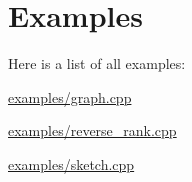 \section{Examples}
Here is a list of all examples\+:\begin{DoxyCompactItemize}
\item 
\hyperlink{examples_2graph_8cpp-example}{examples/graph.\+cpp}
\item 
\hyperlink{examples_2reverse_rank_8cpp-example}{examples/reverse\+\_\+rank.\+cpp}
\item 
\hyperlink{examples_2sketch_8cpp-example}{examples/sketch.\+cpp}
\end{DoxyCompactItemize}
